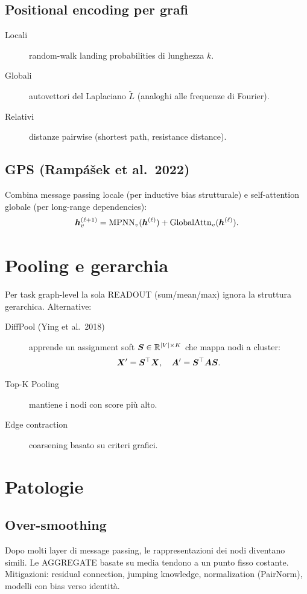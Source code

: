 \subsection{Positional encoding per grafi}
\begin{description}
  \item[Locali] random-walk landing probabilities di lunghezza $k$.
  \item[Globali] autovettori del Laplaciano $\tilde L$ (analoghi alle frequenze di Fourier).
  \item[Relativi] distanze pairwise (shortest path, resistance distance).
\end{description}

\subsection{GPS (Rampášek et al.\ 2022)}
Combina message passing locale (per inductive bias strutturale) e self-attention globale (per long-range dependencies):
\[
\bm{h}_v^{(\ell+1)} = \mathrm{MPNN}_v(\bm{h}^{(\ell)}) + \mathrm{GlobalAttn}_v(\bm{h}^{(\ell)}).
\]

\section{Pooling e gerarchia}

Per task graph-level la sola READOUT (sum/mean/max) ignora la struttura gerarchica. Alternative:
\begin{description}
  \item[DiffPool (Ying et al.\ 2018)] apprende un assignment soft $\bm{S} \in \mathbb{R}^{|V|\times K}$ che mappa nodi a cluster:
  \[
  \bm{X}' = \bm{S}^\top \bm{X}, \quad \bm{A}' = \bm{S}^\top \bm{A} \bm{S}.
  \]
  \item[Top-K Pooling] mantiene i nodi con score più alto.
  \item[Edge contraction] coarsening basato su criteri grafici.
\end{description}

\section{Patologie}

\subsection{Over-smoothing}
Dopo molti layer di message passing, le rappresentazioni dei nodi diventano simili. Le AGGREGATE basate su media tendono a un punto fisso costante. Mitigazioni: residual connection, jumping knowledge, normalization (PairNorm), modelli con bias verso identità.

